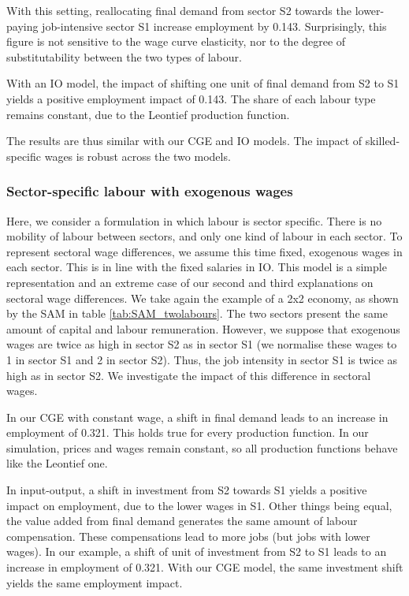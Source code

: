 With this setting, reallocating final demand from sector S2 towards the lower-paying job-intensive sector S1 increase employment by 0.143.
Surprisingly, this figure is not sensitive to the wage curve elasticity, nor to the degree of substitutability between the two types of labour. 

With an IO model, the impact of shifting one unit of final demand from S2 to S1 yields a positive employment impact of 0.143. The share of each labour type remains constant, due to the Leontief production function. 

The results are thus similar with our CGE and IO models. The impact of skilled-specific wages is robust across the two models.


\subsubsection{Sector-specific labour with exogenous wages} \label{subusbsec:fixedWages}

Here, we consider a formulation in which labour is sector specific. There is no mobility of labour between sectors, and only one kind of labour in each sector.
To represent sectoral wage differences, we assume this time fixed, exogenous wages in each sector. This is in line with the fixed salaries in IO. This model is a simple representation and an extreme case of our second and third explanations on sectoral wage differences.
We take again the example of a 2x2 economy, as shown by the SAM in table \ref{tab:SAM_twolabours}.
The two sectors present the same amount of capital and labour remuneration. 
However, we suppose that exogenous wages are twice as high in sector S2 as in sector S1 (we normalise these wages to 1 in sector S1 and 2 in sector S2).
Thus, the job intensity in sector S1 is twice as high as in sector S2.
We investigate the impact of this difference in sectoral wages. 

In our CGE with constant wage, a shift in final demand leads to an increase in employment of 0.321. This holds true for every production function. In our simulation, prices and wages remain constant, so all production functions behave like the Leontief one. 

In input-output, a shift in investment from S2 towards S1 yields a positive impact on employment, due to the lower wages in S1. 
Other things being equal, the value added from final demand generates the same amount of labour compensation. These compensations lead to more jobs (but jobs with lower wages).
In our example, a shift of unit of investment from S2 to S1 leads to an increase in employment of 0.321. 
With our CGE model, the same investment shift yields the same employment impact.

